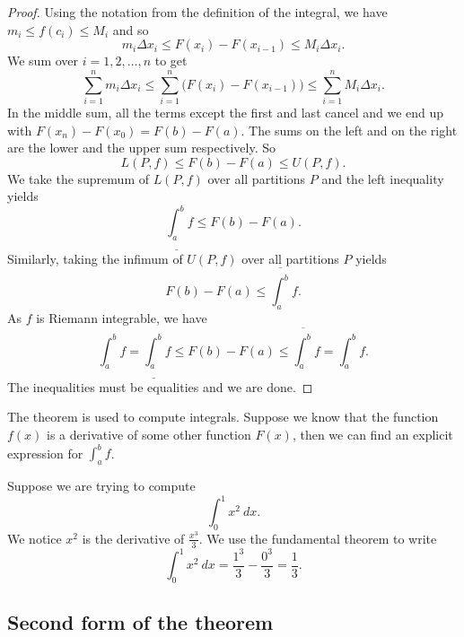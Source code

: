 \begin{proof}
Using the notation from the definition of the integral, we have
$m_i \leq f(c_i) \leq M_i$ and so
\begin{equation*}
m_i \Delta x_i \leq F(x_i) - F(x_{i-1}) \leq M_i \Delta x_i .
\end{equation*}
We sum over $i = 1,2, \ldots, n$ to get
\begin{equation*}
\sum_{i=1}^n m_i \Delta x_i
\leq \sum_{i=1}^n \bigl(F(x_i) - F(x_{i-1}) \bigr)
\leq \sum_{i=1}^n M_i \Delta x_i .
\end{equation*}
In the middle sum, all the terms except the first and last cancel 
and we end up with $F(x_n)-F(x_0) = F(b)-F(a)$.  The sums on the left
and on the right are the lower and the upper sum respectively.  So
\begin{equation*}
L(P,f) \leq F(b)-F(a) \leq U(P,f) .
\end{equation*}
We take the supremum of $L(P,f)$ over all partitions $P$ and the left inequality
yields 
\begin{equation*}
\underline{\int_a^b} f \leq F(b)-F(a) .
\end{equation*}
Similarly, taking
the infimum of $U(P,f)$ over all partitions $P$ yields
\begin{equation*}
F(b)-F(a) \leq \overline{\int_a^b} f .
\end{equation*}
As $f$ is Riemann integrable, we have
\begin{equation*}
\int_a^b f =
\underline{\int_a^b} f \leq F(b)-F(a) \leq \overline{\int_a^b} f
= \int_a^b f .
\end{equation*}
The inequalities must be equalities and we are done.
\end{proof}

The theorem is used to compute integrals.  Suppose we know that
the function $f(x)$ is a derivative of some other function $F(x)$,
then we can find an explicit expression for $\int_a^b f$. 

\begin{example}
Suppose we are trying to compute
\begin{equation*}
\int_0^1 x^2 ~dx .
\end{equation*}
We notice $x^2$ is the derivative of $\frac{x^3}{3}$.  We
use the fundamental theorem to write 
\begin{equation*}
\int_0^1 x^2 ~dx =
\frac{1^3}{3}
-
\frac{0^3}{3}
= \frac{1}{3}.
\end{equation*}
\end{example}

\subsection{Second form of the theorem}

